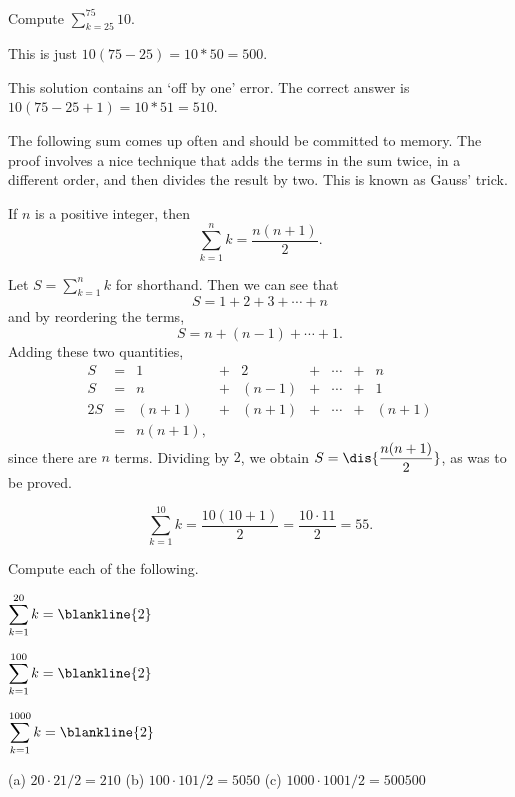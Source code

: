 \begin{eval}
Compute  ${\displaystyle \sum_{k=25}^{75} 10}$.
\begin{ssol}
This is just $10(75-25)=10*50=500$.
\end{ssol}
\evallinetwo
\begin{answer}
This solution contains an `off by one' error.  The correct answer is $10(75-25+1)=10*51=510$.
\end{answer}
\end{eval}

The following sum comes up often and should be committed to memory.
The proof involves a nice technique that adds the terms in the sum twice, 
in a different order, and then divides the result by two. This is known as Gauss' trick.
\begin{thm}\label{thm:sum-of-first-n-integ} 
If $n$ is a positive integer, then 
$$\sum_{k=1}^{n} k = \dfrac{n(n+1)}{2}.$$
\begin{pf} 
Let ${\displaystyle S=\sum_{k=1}^{n} k }$ for shorthand.  Then we can see
that
$$ S =  1 + 2 + 3 + \cdots + n $$
and by reordering the terms, 
$$ S =  n + (n - 1) +  \cdots + 1.$$
Adding these two quantities,
$$ \begin{array}{lcccccccc} S & = & 1 & + &  2 &  + &  \cdots & + & n \\
{S} & {=} & n & + & (n - 1) & + & \cdots & + & 1 \\
\hline
2S & =  & (n + 1) & + & (n + 1) & + & \cdots & + & (n + 1) \\
& = & n(n + 1), & & & & & 
\end{array}$$
since there are $n$ terms. 
Dividing by $2$, we obtain $S = \dis{\dfrac{n(n + 1)}{2}}$, as was to be proved.
\end{pf}
\end{thm}

\begin{exa}
$$\sum_{k=1}^{10}k=\frac{10(10+1)}{2}=\frac{10\cdot 11}{2}=55.$$
\end{exa}


\newpage %

\begin{exer}
Compute each of the following.
\begin{lenum}
\item ${\displaystyle \sum_{k=1}^{20} k = \blankline{2} }$
\item ${\displaystyle \sum_{k=1}^{100} k = \blankline{2} }$
\item ${\displaystyle \sum_{k=1}^{1000} k = \blankline{2} }$
\end{lenum}
\begin{answer}
(a) $20\cdot 21/2=210$
(b) $100\cdot 101/2=5050$
(c) $1000\cdot 1001/2=500500$
\end{answer}
\end{exer}

